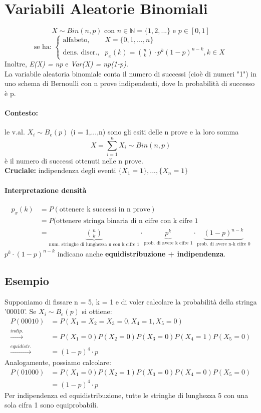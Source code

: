 \documentclass{report}
\begin{document}
\section{Variabili Aleatorie Binomiali}
\[X \sim Bin(n,p) \text{ con } n \in \mathbb{N} = \{1,2,...\} \text{ e } p \in [0,1]\]
\[\text{se ha: }
\begin{cases}
\text{alfabeto}, & \textit{X} = \{0,1,...,n\}\\
\text{dens. discr.}, & p_x(k) = \binom{n}{k}\cdot p^k (1-p)^{n-k}, k \in \textit{X}
\end{cases}\]
Inoltre, \textit{E(X) = np} e \textit{Var(X) = np(1-p)}.\\
La variabile aleatoria binomiale conta il numero di successi (cioè di numeri "1") in uno schema di Bernoulli con n prove indipendenti, dove la probabilità di successo è p.
\paragraph{Contesto:} le v.al. \(X_i \sim B_e(p)\) (i = 1,...,n) sono gli esiti delle n prove e la loro somma
\[X = \sum_{i = 1}^{n} X_i \sim Bin(n,p)\]
è il numero di successi ottenuti nelle n prove.\\
\textbf{Cruciale:} indipendenza degli eventi \(\{X_1 = 1\},..., \{X_n = 1\}\)
\paragraph{Interpretazione densità}
\begin{align}
    p_x(k) &= P(\text{ottenere k successi in n prove})\\
    &= P(\text{ottenere stringa binaria di n cifre con k cifre 1}\\
    &= \underbrace{\binom{n}{k}}_\text{num. stringhe di lunghezza n con k cifre 1} \cdot \underbrace{p^k}_\text{prob. di avere k cifre 1} \cdot \underbrace{(1-p)^{n-k}}_\text{prob. di avere n-k cifre 0}
\end{align}
\(p^k \cdot (1-p)^{n-k}\) indicano anche \textbf{equidistribuzione + indipendenza}.
\subsection{Esempio}
Supponiamo di fissare n = 5, k = 1 e di voler calcolare la probabilità della stringa '00010'. Se \(X_i \sim B_e(p)\) si ottiene:
\begin{align}
    P(00010) & = P(X_1=X_2=X_3=0, X_4=1, X_5 = 0)\\
    \xrightarrow{indip.} & = P(X_1=0)P(X_2=0)P(X_3=0)P(X_4=1)P(X_5=0)\\
    \xrightarrow{equidistr.} & = (1-p)^4 \cdot p
\end{align}
Analogamente, possiamo calcolare:
\begin{align}
    P(01000) & = P(X_1=0)P(X_2=1)P(X_3=0)P(X_4=0)P(X_5=0)\\
    & = (1-p)^4 \cdot p
\end{align}
Per indipendenza ed equidistribuzione, tutte le stringhe di lunghezza 5 con una sola cifra 1 sono equiprobabili.
\end{document}
